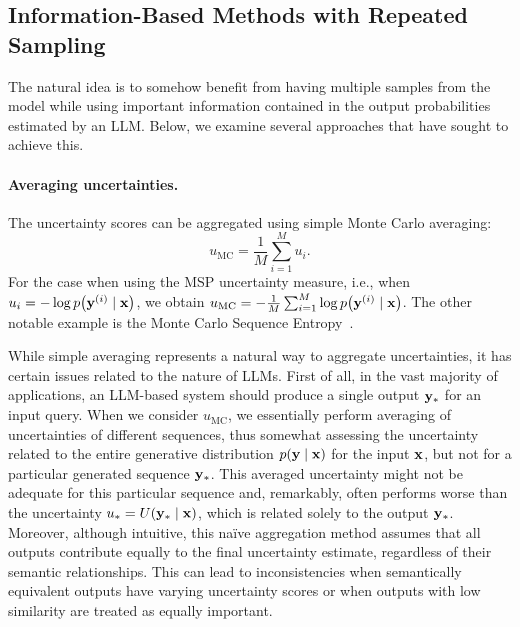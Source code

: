\subsection{Information-Based Methods with Repeated Sampling}
  The natural idea is to somehow benefit from having multiple samples from the model while using important information contained in the output probabilities estimated by an LLM. Below, we examine several approaches that have sought to achieve this.

\paragraph{Averaging uncertainties.}
  The uncertainty scores can be aggregated using simple Monte Carlo averaging:
  \begin{equation}
    u_{\text{MC}} = \frac{1}{M} \sum_{i=1}^M u_i.
  \label{eq:mc_uncertainty}
  \end{equation}
  For the case when using the MSP uncertainty measure, i.e., when $u_i = -\log p\bigl(\mathbf{y}^{(i)} \mid \mathbf{x}\bigr)$, we obtain $u_{\text{MC}} = -\frac{1}{M} \sum_{i=1}^M \log p\bigl(\mathbf{y}^{(i)} \mid \mathbf{x}\bigr)$. The other notable example is the Monte Carlo Sequence Entropy~\citep{kuhn2023semantic}.

  While simple averaging represents a natural way to aggregate uncertainties, it has certain issues related to the nature of LLMs. First of all, in the vast majority of applications, an LLM-based system should produce a single output $\mathbf{y}_*$ for an input query. When we consider $u_{\text{MC}}$, we essentially perform averaging of uncertainties of different sequences, thus somewhat assessing the uncertainty related to the entire generative distribution $p(\mathbf{y} \mid \mathbf{x})$ for the input $\mathbf{x}$, but not for a particular generated sequence $\mathbf{y}_*$. This averaged uncertainty might not be adequate for this particular sequence and, remarkably, often performs worse than the uncertainty $u_* = U(\mathbf{y}_* \mid \mathbf{x})$, which is related solely to the output $\mathbf{y}_*$.
  Moreover, although intuitive, this na\"{i}ve aggregation method assumes that all outputs contribute equally to the final uncertainty estimate, regardless of their semantic relationships. This can lead to inconsistencies when semantically equivalent outputs have varying uncertainty scores or when outputs with low similarity are treated as equally important. 


